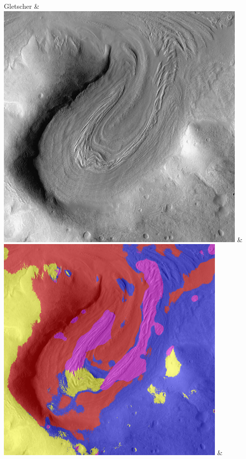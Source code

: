 \begin{table}[h!]
\begin{tabularx}{\textwidth}
		Gletscher &
		\includegraphics[width=.9\linewidth]{images/Gre13/Gre13_05.jpg} &
		\includegraphics[width=.9\linewidth]{images/gen/filterbanks/Gre13_05.jpg_TSUGF.png} &

\end{tabularx}
\end{table}
